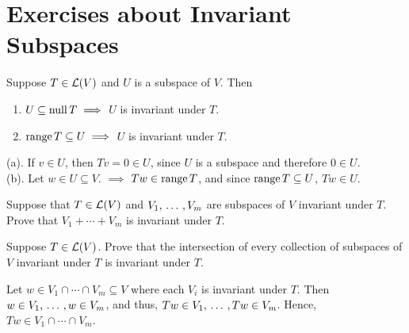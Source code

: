 \section*{Exercises about Invariant Subspaces}

\begin{xrcs}
  Suppose $T \in \mathcal{L}(V)$ and $U$ is a subspace of $V$. Then
  \begin{enumerate}
    \item $U \subseteq \operatorname{null} T \implies$ $U$ is invariant under $T$.
    \item $\operatorname{range} T \subseteq U \implies$ $U$ is invariant under $T$.
  \end{enumerate}

  \begin{xprf}
    { }(a). { }If $v \in U$, then $Tv = 0 \in U$, since $U$ is a subspace and therefore $0 \in U$. \\
    (b). { }Let $w \in U\subseteq V$. $\implies$ $Tw \in \operatorname{range} T$, and since $\operatorname{range} T \subseteq U$, $Tw \in U$.
  \end{xprf}

\end{xrcs}

\begin{xrcs}
  Suppose that $T \in \mathcal{L} (V)$ and $V_1, {\, \ldots \,\,}, V_m$ are subspaces of $V$ invariant under $T$. \\
  Prove that $V_1 + \cdots + V_m$ is invariant under $T$.

\end{xrcs}

\begin{xrcs}
  Suppose $T \in \mathcal{L}(V)$. Prove that the intersection of every collection of subspaces of $V$ invariant under $T$ is invariant under $T$.

  \begin{xprf}
    Let $w \in V_1 \cap \cdots \cap V_m \subseteq V$ where each $V_i$ is invariant under $T$. Then $w \in V_1, {\, \ldots \,\,}, w \in V_m$, and thus, $Tw \in V_1, {\, \ldots \,\,}, Tw \in V_m$. Hence, $Tw \in V_1 \cap \cdots \cap V_m$.
  \end{xprf}
\end{xrcs}

